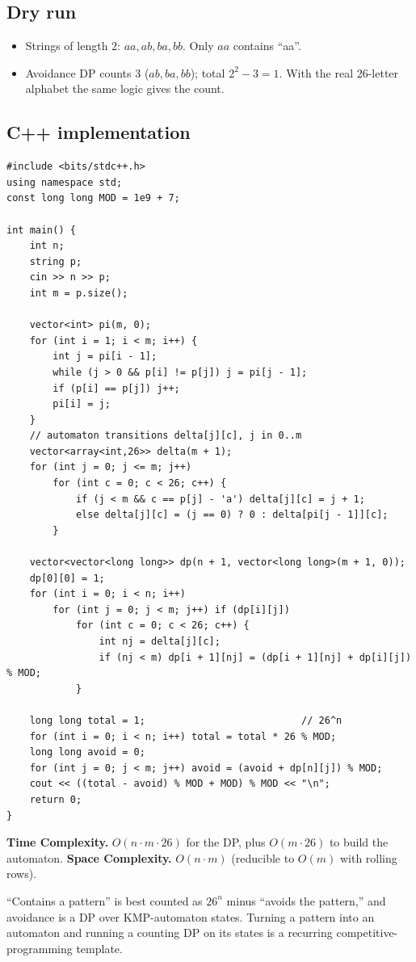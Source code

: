 \subsection*{Dry run}


\begin{itemize}
  \item Strings of length $2$: $aa,ab,ba,bb$. Only $aa$ contains ``aa''.
  \item Avoidance DP counts $3$ ($ab,ba,bb$); total $2^2-3=1$. With the
        real 26-letter alphabet the same logic gives the count.
\end{itemize}

\subsection*{C++ implementation}

\begin{lstlisting}
#include <bits/stdc++.h>
using namespace std;
const long long MOD = 1e9 + 7;

int main() {
    int n;
    string p;
    cin >> n >> p;
    int m = p.size();

    vector<int> pi(m, 0);
    for (int i = 1; i < m; i++) {
        int j = pi[i - 1];
        while (j > 0 && p[i] != p[j]) j = pi[j - 1];
        if (p[i] == p[j]) j++;
        pi[i] = j;
    }
    // automaton transitions delta[j][c], j in 0..m
    vector<array<int,26>> delta(m + 1);
    for (int j = 0; j <= m; j++)
        for (int c = 0; c < 26; c++) {
            if (j < m && c == p[j] - 'a') delta[j][c] = j + 1;
            else delta[j][c] = (j == 0) ? 0 : delta[pi[j - 1]][c];
        }

    vector<vector<long long>> dp(n + 1, vector<long long>(m + 1, 0));
    dp[0][0] = 1;
    for (int i = 0; i < n; i++)
        for (int j = 0; j < m; j++) if (dp[i][j])
            for (int c = 0; c < 26; c++) {
                int nj = delta[j][c];
                if (nj < m) dp[i + 1][nj] = (dp[i + 1][nj] + dp[i][j]) % MOD;
            }

    long long total = 1;                           // 26^n
    for (int i = 0; i < n; i++) total = total * 26 % MOD;
    long long avoid = 0;
    for (int j = 0; j < m; j++) avoid = (avoid + dp[n][j]) % MOD;
    cout << ((total - avoid) % MOD + MOD) % MOD << "\n";
    return 0;
}
\end{lstlisting}

\begin{complexitybox}
\textbf{Time Complexity.} $O(n\cdot m\cdot26)$ for the DP, plus
$O(m\cdot26)$ to build the automaton. \textbf{Space Complexity.}
$O(n\cdot m)$ (reducible to $O(m)$ with rolling rows).
\end{complexitybox}

\begin{takeawaybox}
``Contains a pattern'' is best counted as $26^n$ minus ``avoids the
pattern,'' and avoidance is a DP over KMP-automaton states. Turning a
pattern into an automaton and running a counting DP on its states is a
recurring competitive-programming template.
\end{takeawaybox}
